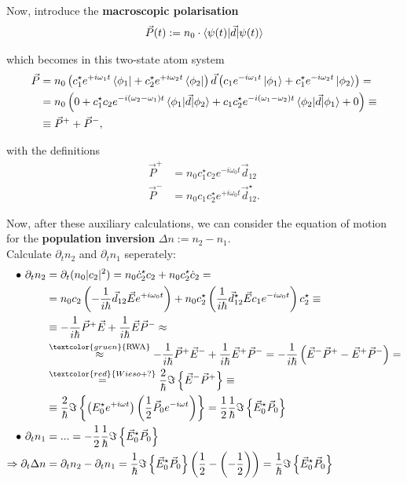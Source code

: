 \documentclass{article}
\newcommand{\lr}[1]{\left(#1\right)}
\newcommand{\lrschweif}[1]{\left\{#1\right\}}
\newcommand{\commenttext}[1]{\textcolor{gruen}{\text{#1}}}
\begin{document}
{	Now, introduce the \textbf{macroscopic polarisation}
		\begin{align*}
			\vec{P}(t) := n_0 \cdot \braket{ \psi(t) | \vec{d} | \psi(t) }
		\end{align*}
	
	which becomes in this two-state atom system
		\begin{align*}
			\vec{P} &= n_0 \lr{ c_1^\star e^{+i\omega_1 t} \bra{\phi_1} + c_2^\star e^{+i\omega_2 t} \bra{\phi_2} } \vec{d} \lr{ c_1 e^{-i\omega_1 t} \ket{\phi_1} + c_1^\star e^{-i\omega_2 t} \ket{\phi_2} } = \\
			&= n_0 \lr{ 0 + c_1^\star c_2 e^{-i(\omega_2 - \omega_1)t} \braket{ \phi_1 | \vec{d} | \phi_2 } + c_1 c_2^\star e^{-i(\omega_1 - \omega_2)t} \braket{ \phi_2 | \vec{d} | \phi_1} + 0 } \equiv \\
			&\equiv \vec{P}^+ + \vec{P}^-,
		\end{align*}
	
	with the definitions
		\begin{align*}
			\vec{P}^+ &= n_0 c_1^\star c_2 e^{-i\omega_0 t} \vec{d}_{12} \\
			\vec{P}^- &= n_0 c_1 c_2^\star e^{+i\omega_0 t} \vec{d}_{12}^\star.
		\end{align*}
	
	Now, after these auxiliary calculations, we can consider the equation of motion for the \textbf{population inversion} $\Delta n := n_2 - n_1$.\\
	Calculate $\partial_t n_2$ and $\partial_t n_1$ seperately:
		\begin{align*}
			\bullet \ \partial_t n_2 &= \partial_t (n_0 |c_2|^2) = n_0 \dot{c}_2^\star c_2 + n_0 c_2^\star \dot{c}_2 = \\
			&= n_0 c_2 \lr{ -\frac{1}{i\hbar} \vec{d}_{12} \vec{E} e^{+i\omega_0 t} } + n_0 c_2^\star \lr{ \frac{1}{i\hbar} \vec{d}_{12}^\star \vec{E} c_1 e^{-i\omega_0 t} } c_2^\star \equiv \\
			&\equiv -\frac{1}{i\hbar} \vec{P}^+ \vec{E} + \frac{1}{i\hbar} \vec{E}\vec{P}^- \approx \\
			&\stackrel{\commenttext{RWA}}{\approx} -\frac{1}{i\hbar} \vec{P}^+ \vec{E}^- + \frac{1}{i\hbar} \vec{E}^+\vec{P}^- = -\frac{1}{i\hbar} \lr{ \vec{E}^- \vec{P}^+ - \vec{E}^+ \vec{P}^- } = \\
			&\stackrel{\textcolor{red}{Wieso +?}}{=} \frac{2}{\hbar} \Im \lrschweif{ \vec{E}^-\vec{P}^+ } \equiv \\
			&\equiv \frac{2}{\hbar} \Im \lrschweif{ \lr{ E_0^\star e^{+i\omega t} } \lr{ \frac{1}{2} \vec{P}_0 e^{-i\omega t} } } = \frac{1}{2} \frac{1}{\hbar} \Im \lrschweif{ \vec{E}_0^\star \vec{P}_0 } \\
			\bullet \ \partial_t n_1 &= ... = - \frac{1}{2} \frac{1}{\hbar} \Im \lrschweif{ \vec{E}_0^\star \vec{P}_0 } \\
			\Rightarrow \partial_t \Delta n &= \partial_t n_2 - \partial_t n_1 = \frac{1}{\hbar}  \Im \lrschweif{ \vec{E}_0^\star \vec{P}_0 } \lr{ \frac{1}{2} - \lr{-\frac{1}{2}} } = \frac{1}{\hbar} \Im \lrschweif{ \vec{E}_0^\star \vec{P}_0 }
		\end{align*}

}
\end{document}
